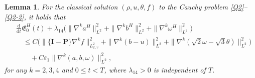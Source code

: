 \documentclass[reqno,11pt]{amsart}
\theoremstyle{plain}
\newtheorem{lem}[thm]{Lemma}
\numberwithin{equation}{section}
\newcommand{\eps}{{\varepsilon}}
\begin{document}
\begin{lem}\label{L5.4}
For  the classical solution $(\rho, u,\theta,f)$ to the Cauchy problem \eqref{Q2}--\eqref{Q2-2}, it holds that 
\begin{align}\label{G5.29}
& \frac{\mathrm{d}}{\mathrm{d} t} \mathfrak{E}_0^H(t)+\lambda_{14}\big(\|\nabla^k a^H\|_{L^2}^2+\|\nabla^k b^H\|_{L^2}^2+\|\nabla^k \omega^H\|_{L^2}^2 \big)\nonumber\\
&\quad \leq  C \big(\|\{\mathbf{I}-\mathbf{P}\}\nabla^k f\|_{L_{x,v}^2}^2+\|\nabla^k(b-u)\|_{L^2}^2+\|\nabla^k(\sqrt{2} \omega-\sqrt{3} \theta)\|_{L^2}^2 \big) \nonumber\\
& \qquad +C\eps_1\|\nabla^k(a,b,\omega)\|_{L^2}^2,
\end{align}
for any $k=2,3,4$ and $0 \leq t <T$, where $\lambda_{14}>0$ is independent of  $T$. 
\end{lem}
\end{document}

